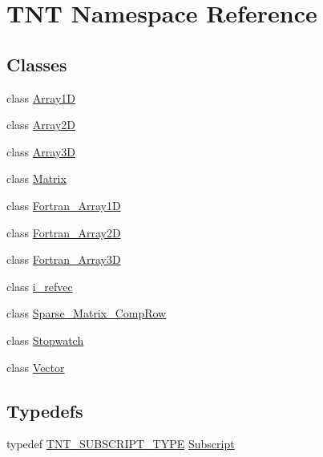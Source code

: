 \hypertarget{namespaceTNT}{\section{T\-N\-T Namespace Reference}
\label{namespaceTNT}
}
\subsection*{Classes}
\begin{DoxyCompactItemize}
\item 
class \hyperlink{classTNT_1_1Array1D}{Array1\-D}
\item 
class \hyperlink{classTNT_1_1Array2D}{Array2\-D}
\item 
class \hyperlink{classTNT_1_1Array3D}{Array3\-D}
\item 
class \hyperlink{classTNT_1_1Matrix}{Matrix}
\item 
class \hyperlink{classTNT_1_1Fortran__Array1D}{Fortran\-\_\-\-Array1\-D}
\item 
class \hyperlink{classTNT_1_1Fortran__Array2D}{Fortran\-\_\-\-Array2\-D}
\item 
class \hyperlink{classTNT_1_1Fortran__Array3D}{Fortran\-\_\-\-Array3\-D}
\item 
class \hyperlink{classTNT_1_1i__refvec}{i\-\_\-refvec}
\item 
class \hyperlink{classTNT_1_1Sparse__Matrix__CompRow}{Sparse\-\_\-\-Matrix\-\_\-\-Comp\-Row}
\item 
class \hyperlink{classTNT_1_1Stopwatch}{Stopwatch}
\item 
class \hyperlink{classTNT_1_1Vector}{Vector}
\end{DoxyCompactItemize}
\subsection*{Typedefs}
\begin{DoxyCompactItemize}
\item 
typedef \hyperlink{tnt__subscript_8h_ae204fca2c823f77ee865da86d3bf53d0}{T\-N\-T\-\_\-\-S\-U\-B\-S\-C\-R\-I\-P\-T\-\_\-\-T\-Y\-P\-E} \hyperlink{namespaceTNT_af22e3f1460e145c04ce4e7d701e4c1c1}{Subscript}
\end{DoxyCompactItemize}
